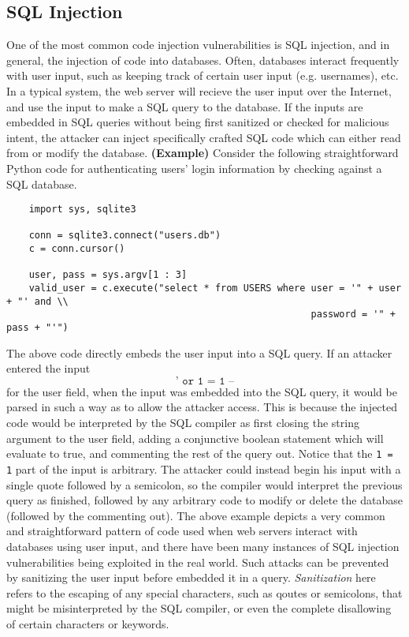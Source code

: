 \documentclass{article}
\begin{document}
\subsection{SQL Injection}
One of the most common code injection vulnerabilities is SQL injection, and in general, the injection of code into databases. Often, databases interact frequently with user input, such as keeping track of certain user input (e.g. usernames), etc. In a typical system, the web server will recieve the user input over the Internet, and use the input to make a SQL query to the database. If the inputs are embedded in SQL queries without being first sanitized or checked for malicious intent, the attacker can inject specifically crafted SQL code which can either read from or modify the database.
\newline \newline
\textbf{(Example)} Consider the following straightforward Python code for authenticating users' login information by checking against a SQL database.
\begin{lstlisting}
    import sys, sqlite3

    conn = sqlite3.connect("users.db")
    c = conn.cursor()

    user, pass = sys.argv[1 : 3]
    valid_user = c.execute("select * from USERS where user = '" + user + "' and \\
                                                      password = '" + pass + "'")
\end{lstlisting}
The above code directly embeds the user input into a SQL query. If an attacker entered the input 
$$ \texttt{' or 1 = 1 --} $$
for the user field, when the input was embedded into the SQL query, it would be parsed in such a way as to allow the attacker access. This is because the injected code would be interpreted by the SQL compiler as first closing the string argument to the user field, adding a conjunctive boolean statement which will evaluate to true, and commenting the rest of the query out. Notice that the \texttt{1 = 1} part of the input is arbitrary. The attacker could instead begin his input with a single quote followed by a semicolon, so the compiler would interpret the previous query as finished, followed by any arbitrary code to modify or delete the database (followed by the commenting out).
\newline \newline
The above example depicts a very common and straightforward pattern of code used when web servers interact with databases using user input, and there have been many instances of SQL injection vulnerabilities being exploited in the real world. Such attacks can be prevented by sanitizing the user input before embedded it in a query. \textit{Sanitization} here refers to the escaping of any special characters, such as qoutes or semicolons, that might be misinterpreted by the SQL compiler, or even the complete disallowing of certain characters or keywords.
\end{document}
